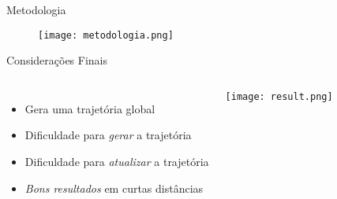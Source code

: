 \begin{frame}[c]{Metodologia}
    \begin{figure}
        \texttt{[image: metodologia.png]}
    \end{figure}
\end{frame}
\begin{frame}[c]{Considerações Finais}
    \begin{columns}
            \begin{itemize}
                \item Gera uma trajetória global
                \item Dificuldade para \emph{gerar} a trajetória
                \item Dificuldade para \emph{atualizar} a trajetória
                \item \emph{Bons resultados} em curtas distâncias
            \end{itemize}
             \texttt{[image: result.png]}
    \end{columns}
\end{frame}
